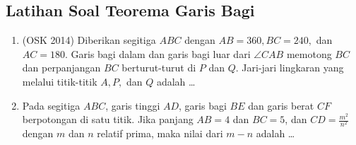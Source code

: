 \subsection{Latihan Soal Teorema Garis Bagi}
\begin{enumerate}
    \item (OSK 2014) Diberikan segitiga $ABC$ dengan $AB = 360, BC = 240,$ dan $AC = 180$. Garis bagi dalam dan garis bagi luar dari $\angle CAB$ memotong $BC$ dan perpanjangan $BC$ berturut-turut di $P$ dan $Q$. Jari-jari lingkaran yang melalui titik-titik $A, P,$ dan $Q$ adalah \dots
    \item Pada segitiga $ABC$, garis tinggi $AD$, garis bagi $BE$ dan garis berat $CF$ berpotongan di satu titik. Jika panjang $AB = 4$ dan $BC = 5$, dan $CD = \frac{m^2}{n^2}$ dengan $m$ dan $n$ relatif prima, maka nilai dari $m - n$ adalah \ldots
\end{enumerate}